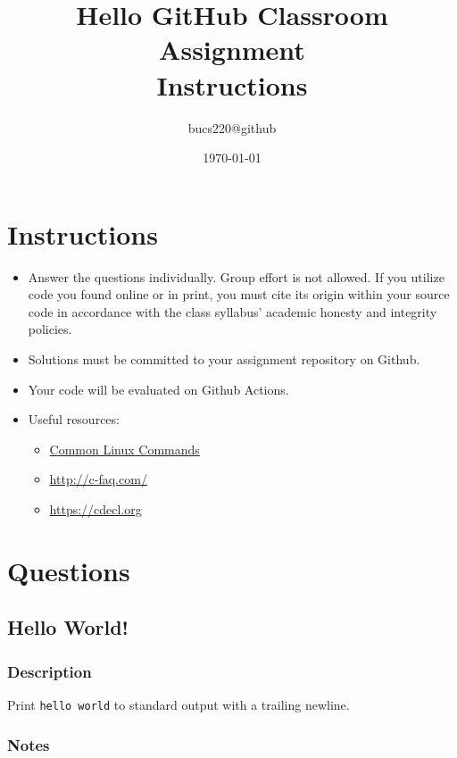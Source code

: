 \documentclass{article}
\begin{document}
  \title{Hello GitHub Classroom Assignment \\ Instructions}
  \author{bucs220@github}
  \date{\today}
  \maketitle

\section{Instructions}
\begin{itemize}
  \item Answer the questions individually. Group effort is not allowed. If you utilize code you found online or in print, you must cite its origin within your source code in accordance with the class syllabus' academic honesty and integrity policies.
  \item Solutions must be committed to your assignment repository on Github.
  \item Your code will be evaluated on Github Actions.
  \item Useful resources:
  \begin{itemize}
    \item \href{http://www.informit.com/blogs/blog.aspx?uk=The-10-Most-Important-Linux-Commands}{Common Linux Commands}
    \item \url{http://c-faq.com/}
    \item \url{https://cdecl.org}
  \end{itemize}
\end{itemize}

\section{Questions}

\subsection{Hello World!}
\subsubsection{Description}
Print {\tt hello world} to standard output with a trailing newline.

\subsubsection{Notes}
\blindtext
\end{document}

